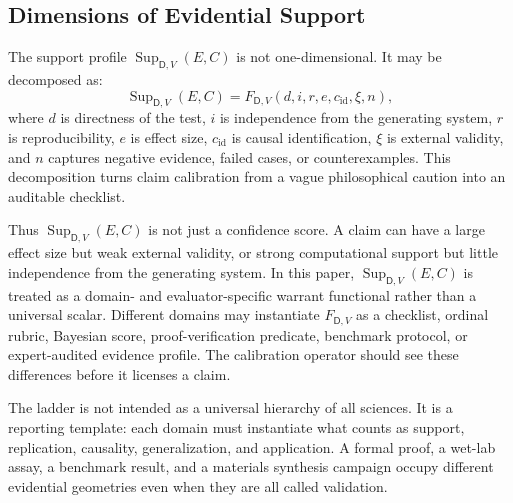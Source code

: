 \documentclass[11pt,a4paper]{article}
\newcommand{\Sup}{\operatorname{Sup}}
\newcommand{\Dom}{\mathsf{D}}
\begin{document}
\subsection{Dimensions of Evidential Support}

The support profile $\Sup_{\Dom,V}(E,C)$ is not one-dimensional. It may be decomposed as:
\begin{equation}
\Sup_{\Dom,V}(E,C)=F_{\Dom,V}(d,i,r,e,c_{\mathrm{id}},\xi,n),
\end{equation}
where $d$ is directness of the test, $i$ is independence from the generating system, $r$ is reproducibility, $e$ is effect size, $c_{\mathrm{id}}$ is causal identification, $\xi$ is external validity, and $n$ captures negative evidence, failed cases, or counterexamples. This decomposition turns claim calibration from a vague philosophical caution into an auditable checklist.

Thus $\Sup_{\Dom,V}(E,C)$ is not just a confidence score. A claim can have a large effect size but weak external validity, or strong computational support but little independence from the generating system. In this paper, $\Sup_{\Dom,V}(E,C)$ is treated as a domain- and evaluator-specific warrant functional rather than a universal scalar. Different domains may instantiate $F_{\Dom,V}$ as a checklist, ordinal rubric, Bayesian score, proof-verification predicate, benchmark protocol, or expert-audited evidence profile. The calibration operator should see these differences before it licenses a claim.

The ladder is not intended as a universal hierarchy of all sciences. It is a reporting template: each domain must instantiate what counts as support, replication, causality, generalization, and application. A formal proof, a wet-lab assay, a benchmark result, and a materials synthesis campaign occupy different evidential geometries even when they are all called validation.
\end{document}
